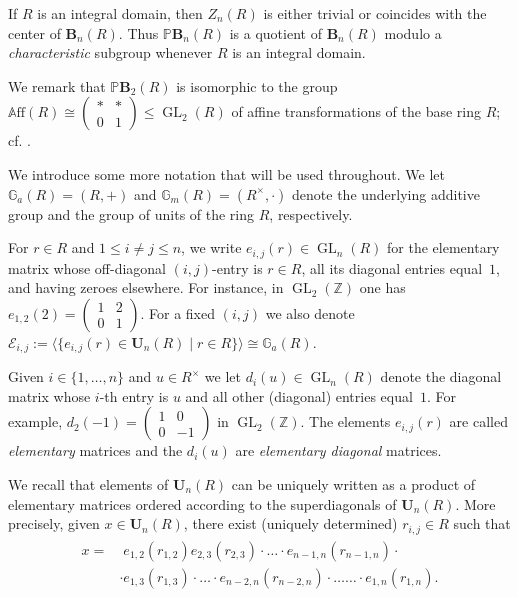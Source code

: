 \documentclass[a4paper,11pt]{amsart}
\numberwithin{equation}{section}
\theoremstyle{plain}
\theoremstyle{definition}
\newenvironment{rmk}
  {\pushQED{\qed}\renewcommand{\qedsymbol}{$\triangle$}\rmkx}
  {\popQED\endrmkx}
\newcommand{\Z}{\mathbb{Z}}
\DeclareMathOperator{\GL}{GL} %
\newcommand{\eij}{e_{i,j}} %
\newcommand{\di}{d_i} %
\newcommand{\dk}[1]{d_{#1}} %
\newcommand{\ekl}[1]{e_{#1}} %
\newcommand{\mbU}{\mathbf{U}} %
\newcommand{\Mult}{\mathbb{G}_{m}} %
\newcommand{\Addi}{\mathbb{G}_{a}} %
\newcommand{\Aff}{\mathbb{A}\mathrm{ff}} %
\newcommand{\mbB}{\mathbf{B}} %
\newcommand{\PB}{\mathbb{P}\mathbf{B}} %
\newcommand{\set}[1]{\{ #1 \}}
\newcommand{\mc}{\mathcal}
\begin{document}
\begin{rmk} \label{obs:centerBn} If $R$ is an integral domain, then $Z_n(R)$ 
is either trivial or coincides with the center of $\mbB_n(R)$. 
Thus $\PB_n(R)$ 
is a quotient of $\mbB_n(R)$ 
modulo a \emph{characteristic} subgroup whenever $R$ is an integral domain. 
\end{rmk}

We remark that $\PB_2(R)$ is isomorphic to the group $\Aff(R) \cong \left( \begin{smallmatrix} * & * \\ 0 & 1 \end{smallmatrix} \right) \leq \GL_2(R)$ of affine transformations of the base ring $R$; cf. \cite[Section~3]{Bn1}.

\medskip

We introduce some more notation that will be used throughout. We let $\Addi(R) = (R,+)$ and $\Mult(R) = (R^\times, \cdot)$ denote the underlying additive group and the group of units of the ring $R$, respectively.

For $r \in R$ and $1 \leq i \neq j \leq n$, we write $\eij(r) \in \GL_n(R)$ for the elementary matrix whose off-diagonal $(i,j)$-entry is $r \in R$, all its diagonal entries equal~$1$, and having zeroes elsewhere. For instance, in $\GL_2(\Z)$ one has $\ekl{1,2}(2) = \left( \begin{smallmatrix} 1 & 2 \\ 0 & 1 \end{smallmatrix} \right)$. For a fixed $(i,j)$ we also denote $\mc{E}_{i,j} := \langle \{ \ekl{i,j}(r) \in \mbU_n(R) \mid r \in R \}\rangle \cong \Addi(R)$.

Given $i \in \set{1,\ldots,n}$ and $u \in R^\times$ we let $\di(u) \in \GL_n(R)$ denote the diagonal matrix whose $i$-th entry is $u$ and all other (diagonal) entries equal~$1$. For example, $\dk{2}(-1) = \left( \begin{smallmatrix} 1 & 0 \\ 0 & -1 \end{smallmatrix} \right)$ in $\GL_2(\Z)$. 
The elements 
$\eij(r)$ are called \emph{elementary} matrices and the $\di(u)$ are 
\emph{elementary diagonal} matrices.

We recall that elements of $\mbU_n(R)$ can be uniquely written as a product of elementary matrices ordered according to the superdiagonals of $\mbU_n(R)$. More precisely, given $x \in \mbU_n(R)$, there exist (uniquely determined) $r_{i,j} \in R$ such that 
\begin{align} \label{rel:elementsofUn} 
\begin{split}
x = & \phantom{.} e_{1,2}(r_{1,2}) e_{2,3}(r_{2,3}) \cdot \ldots \cdot e_{n-1,n}(r_{n-1,n}) \cdot \\
 & \cdot  e_{1,3}(r_{1,3}) \cdot \ldots \cdot e_{n-2,n}(r_{n-2,n}) \cdot \ldots \ldots \cdot e_{1,n}(r_{1,n}). 
\end{split}
\end{align}
\end{document}
